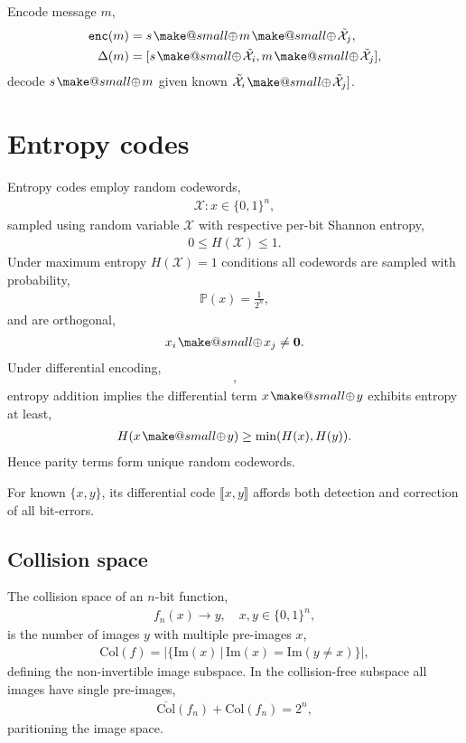 \documentclass[twocolumn, aps, amsmath, amssymb, nofootinbib, superscriptaddress, longbibliography, doublefloatfix, table-of-contents, eqsecnum, rmp]{revtex4-2}
\makeatletter
\def\diff#1#2{\llbracket #1,#2\rrbracket}
\newcommand{\soplus}{{{\hspace{1pt}}{\mathbin{\mathpalette\make@small{\mathbin\oplus}}}}{\hspace{1pt}}}
\newcommand{\make@small}[2]{%
  \vcenter{\hbox{%
    \scalebox{0.6}{$\m@th#1#2$}%
  }}%
}
\makeatother
\begin{document}
Encode message $m$,
\begin{align}
\mathtt{enc}(m) &= s\soplus m \soplus \tilde{\mathcal{X}}_j,\nonumber\\
\Delta(m) &= [s\soplus \tilde{\mathcal{X}}_i, m \soplus \tilde{\mathcal{X}}_j],
\end{align}
decode $s\soplus m$ given known $\tilde{\mathcal{X}}_i \soplus \tilde{\mathcal{X}}_j]$.

\section{Entropy codes}

Entropy codes employ random codewords,
\begin{align}
	\mathcal{X}: x \in \{0,1\}^n,
\end{align}
sampled using random variable $\mathcal{X}$ with respective per-bit Shannon entropy,
\begin{align}
	0\leq H(\mathcal{X})\leq 1.
\end{align}
Under maximum entropy $H(\mathcal{X})=1$ conditions all codewords are sampled with probability,
\begin{align}
	\mathbb{P}(x) = \frac{1}{2^n},	
\end{align}
and are orthogonal,
\begin{align}
	x_i \soplus x_j \neq \mathbf{0}.
\end{align}
Under differential encoding,
\begin{align}
	[x,x\soplus y],
\end{align}
entropy addition implies the differential term $x\soplus y$ exhibits entropy at least,
\begin{align}
	H(x\soplus y) \geq \min(H(x),H(y)).
\end{align}
Hence parity terms form unique random codewords.

For known $\{x,y\}$, its differential code $\diff{x}{y}$ affords both detection and correction of all bit-errors.

\subsection{Collision space}

The collision space of an $n$-bit function,
\begin{align}
	f_n(x) \to y,\quad x,y\in\{0,1\}^n,
\end{align}
is the number of images $y$ with multiple pre-images $x$,
\begin{align}
	\mathrm{Col}(f) = |\{\mathrm{Im}(x)\,|\,\mathrm{Im}(x)=\mathrm{Im}(y\neq x)\}|,
\end{align}
defining the non-invertible image subspace. In the collision-free subspace all images have single pre-images,
\begin{align}
	\overline{\mathrm{Col}}(f_n) + \mathrm{Col}(f_n) = 2^n,
\end{align}
paritioning the image space.
\end{document}
